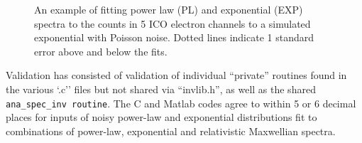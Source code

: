 \documentclass{article}    %
\begin{document}
\begin{figure}
\caption{An example of fitting power law (PL) and exponential (EXP) spectra
  to the counts in 5 ICO electron channels to a simulated exponential
  with Poisson noise. Dotted lines indicate 1 standard error above and
  below the fits.}
\label{figAnalyticalFitExample}
\end{figure}

Validation has consisted of validation of individual ``private''
routines found in the various `.c'' files but not shared via
``invlib.h'', as well as the shared \verb|ana_spec_inv routine|. The C
and Matlab codes agree to within 5 or 6 decimal places for inputs of
noisy power-law and exponential distributions fit to combinations of
power-law, exponential and relativistic Maxwellian spectra.
\end{document}
